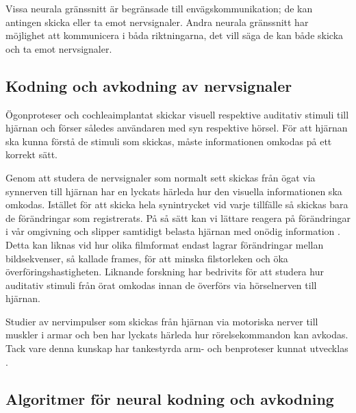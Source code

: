 \documentclass[12pt, a4paper]{article}
\begin{document}
Vissa neurala gränssnitt är begränsade till envägskommunikation; de kan antingen skicka eller ta emot nervsignaler. Andra neurala gränssnitt har möjlighet att kommunicera i båda riktningarna, det vill säga de kan både skicka och ta emot nervsignaler.


\subsection{Kodning och avkodning av nervsignaler}
\label{enc_dec}

Ögonproteser \cite{sight2} och cochleaimplantat \cite{sound} skickar visuell respektive auditativ stimuli till hjärnan och förser således användaren med syn respektive hörsel. För att hjärnan ska kunna förstå de stimuli som skickas, måste informationen omkodas på ett korrekt sätt.

Genom att studera de nervsignaler som normalt sett skickas från ögat via synnerven till hjärnan har en lyckats härleda hur den visuella informationen ska omkodas. Istället för att skicka hela synintrycket vid varje tillfälle så skickas bara de förändringar som registrerats. På så sätt kan vi lättare reagera på förändringar i vår omgivning och slipper samtidigt belasta hjärnan med onödig information \cite{sight1}. Detta kan liknas vid hur olika filmformat endast lagrar förändringar mellan bildsekvenser, så kallade frames, för att minska filstorleken och öka överföringshastigheten. Liknande forskning har bedrivits för att studera hur auditativ stimuli från örat omkodas innan de överförs via hörselnerven till hjärnan.

Studier av nervimpulser som skickas från hjärnan via motoriska nerver till muskler i armar och ben har lyckats härleda hur rörelsekommandon kan avkodas. Tack vare denna kunskap har tankestyrda arm- och benproteser kunnat utvecklas \cite{prosthetic_operation}.


\subsection{Algoritmer för neural kodning och avkodning}

\end{document}
